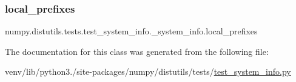 \subsubsection{\texorpdfstring{local\+\_\+prefixes}{local\_prefixes}}
{\footnotesize\ttfamily numpy.\+distutils.\+tests.\+test\+\_\+system\+\_\+info.\+\_\+system\+\_\+info.\+local\+\_\+prefixes}



The documentation for this class was generated from the following file\+:\begin{DoxyCompactItemize}
\item 
venv/lib/python3./site-\/packages/numpy/distutils/tests/\hyperlink{test__system__info_8py}{test\+\_\+system\+\_\+info.\+py}\end{DoxyCompactItemize}
